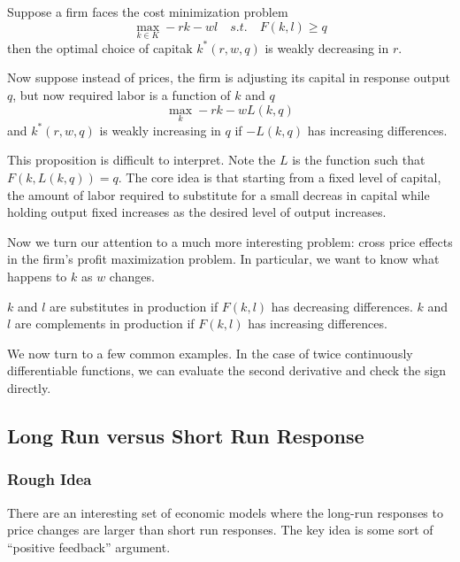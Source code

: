 \begin{prop}
  Suppose a firm faces the cost minimization problem
  \[
  \max_{k \in K} -rk - wl \quad s.t. \quad F(k,l) \geq q
  \]
  then the optimal choice of capitak $k^*(r,w,q)$ is weakly decreasing
  in $r$.
\end{prop}

\begin{prop}
  Now suppose instead of prices, the firm is adjusting its capital in
  response output $q$, but now required labor is a function of $k$ and
  $q$
  \[
  \max_k -rk - wL(k,q)
  \]
  and $k^*(r,w,q)$ is weakly increasing in $q$ if $-L(k,q)$ has
  increasing differences.
\end{prop}

This proposition is difficult to interpret. Note the $L$ is the
function such that $F(k, L(k,q)) = q$. The core idea is that starting
from a fixed level of capital, the amount of labor required to
substitute for a small decreas in capital while holding output fixed
increases as the desired level of output increases.

Now we turn our attention to a much more interesting problem: cross
price effects in the firm's profit maximization problem. In
particular, we want to know what happens to $k$ as $w$ changes.

\begin{definition}
  $k$ and $l$ are substitutes in production if $F(k,l)$ has decreasing
  differences. $k$ and $l$ are complements in production if $F(k,l)$
  has increasing differences.
\end{definition}

We now turn to a few common examples. In the case of twice
continuously differentiable functions, we can evaluate the second
derivative and check the sign directly.





\subsection{Long Run versus Short Run Response}
\label{sec:LR-SR}

\subsubsection{Rough Idea}

There are an interesting set of economic models where the long-run
responses to price changes are larger than short run responses. The
key idea is some sort of ``positive feedback'' argument.

